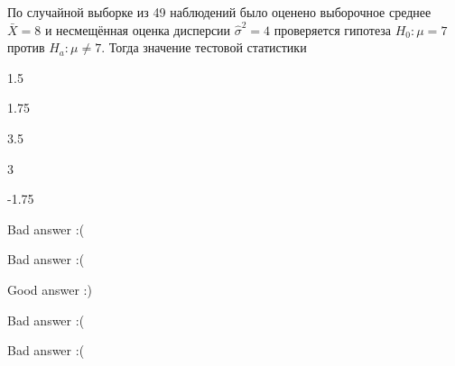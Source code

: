 
\begin{question}
По случайной выборке из 49 наблюдений было оценено выборочное среднее
\(\bar{X} = 8\) и несмещённая оценка дисперсии \(\hat{\sigma}^2 = 4\)
проверяется гипотеза \(H_0: \mu = 7\) против \(H_a: \mu \ne 7\). Тогда
значение тестовой статистики
\begin{answerlist}
  \item 1.5
  \item 1.75
  \item 3.5
  \item 3
  \item -1.75
\end{answerlist}
\end{question}

\begin{solution}
\begin{answerlist}
  \item Bad answer :(
  \item Bad answer :(
  \item Good answer :)
  \item Bad answer :(
  \item Bad answer :(
\end{answerlist}
\end{solution}


